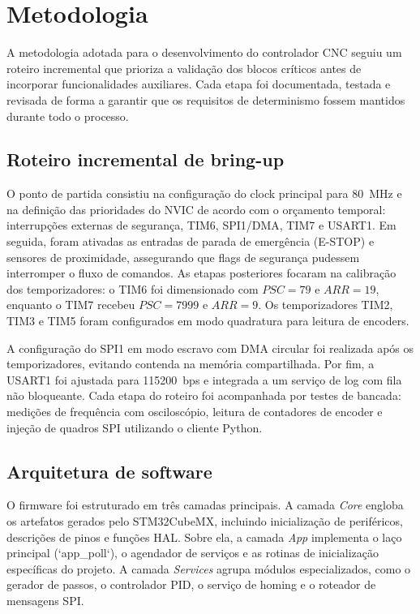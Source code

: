 \chapter{Metodologia}\label{cap:metodologia}

A metodologia adotada para o desenvolvimento do controlador CNC seguiu
um roteiro incremental que prioriza a validação dos blocos críticos antes
de incorporar funcionalidades auxiliares. Cada etapa foi documentada,
testada e revisada de forma a garantir que os requisitos de determinismo
fossem mantidos durante todo o processo.

\section{Roteiro incremental de bring-up}

O ponto de partida consistiu na configuração do clock principal para
\SI{80}{\mega\hertz} e na definição das prioridades do NVIC de acordo
com o orçamento temporal: interrupções externas de segurança, TIM6,
SPI1/DMA, TIM7 e USART1. Em seguida, foram ativadas as entradas de parada
de emergência (E-STOP) e sensores de proximidade, assegurando que flags
de segurança pudessem interromper o fluxo de comandos. As etapas
posteriores focaram na calibração dos temporizadores: o TIM6 foi
dimensionado com $PSC = 79$ e $ARR = 19$, enquanto o TIM7 recebeu
$PSC = 7999$ e $ARR = 9$. Os temporizadores TIM2, TIM3 e TIM5 foram
configurados em modo quadratura para leitura de encoders.

A configuração do SPI1 em modo escravo com DMA circular foi realizada
após os temporizadores, evitando contenda na memória compartilhada.
Por fim, a USART1 foi ajustada para \SI{115200}{bps} e integrada a um
serviço de log com fila não bloqueante. Cada etapa do roteiro foi
acompanhada por testes de bancada: medições de frequência com
osciloscópio, leitura de contadores de encoder e injeção de quadros SPI
utilizando o cliente Python.

\section{Arquitetura de software}

O firmware foi estruturado em três camadas principais. A camada \emph{Core}
engloba os artefatos gerados pelo STM32CubeMX, incluindo inicialização de
periféricos, descrições de pinos e funções HAL. Sobre ela, a camada
\emph{App} implementa o laço principal (`app_poll`), o agendador de
serviços e as rotinas de inicialização específicas do projeto. A camada
\emph{Services} agrupa módulos especializados, como o gerador de passos,
o controlador PID, o serviço de homing e o roteador de mensagens SPI.

